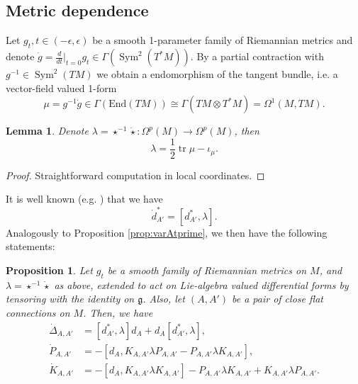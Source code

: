 \documentclass[11pt,a4paper]{amsart}
\theoremstyle{plain} %
\newtheorem{lem}[thm]{Lemma}
\newtheorem{prop}[thm]{Proposition}
\theoremstyle{definition}
\theoremstyle{remark}
\newcommand{\g}{\mathfrak{g}}
\newcommand{\dd}{d}
\newcommand{\tr}{\operatorname{tr}}
\newcommand{\Sym}{\operatorname{Sym}}
\newcommand{\mr}{\mathrm}
\begin{document}
\subsection{Metric dependence}\label{sec: metric}
Let $g_t, t \in (-\epsilon,\epsilon)$ be a smooth 1-parameter family of Riemannian metrics and denote $\dot{g} = \frac{d}{dt}\big|_{t=0}g_t \in \Gamma(\Sym^2(T^*M))$. By a partial contraction with $g^{-1} \in \Sym^2(TM)$ we obtain a endomorphism of the tangent bundle, i.e. a vector-field valued 1-form
\begin{equation}
    \mu = g^{-1}\dot{g}\in\Gamma(\mr{End}(TM)) \cong \Gamma(TM \otimes T^*M) = \Omega^1(M,TM).
\end{equation}
\begin{lem}\label{lem: lambda formula}
 Denote $\lambda = \star^{-1} \dot{\star} \colon \Omega^p(M) \to \Omega^p(M)$, then 
 \begin{equation}
     \lambda = \frac12\tr\mu - \iota_\mu.
 \end{equation}
\end{lem}
\begin{proof}
Straightforward computation in local coordinates.
\end{proof}
It is well known (e.g. \cite{Ray1971}) that we have 
    \begin{equation} \dot{\dd}^*_{A'} = [\dd^*_{A'},\lambda].\label{eq: var d star metric}\end{equation}
Analogously to Proposition \ref{prop:varAtprime}, we then have the following statements:
\begin{prop}
    Let $g_t$ be a smooth family of Riemannian metrics on $M$, and $\lambda = \star^{-1} \dot{\star}$ as above, extended to act on Lie-algebra valued differential forms by tensoring with the identity on $\g$. Also, let $(A,A')$ be a pair of close flat connections on $M$. Then, we have 
\begin{align}
    \dot{\Delta}_{A,A'} &= [\dd^*_{A'},\lambda]\dd_A + \dd_A[\dd^*_{A'},\lambda], \label{eq: var Delta metric} \\
    \dot{P}_{A,A'} &= - [\dd_A, K_{A,A'}\lambda P_{A,A'} - P_{A,A'}\lambda K_{A,A'}], \label{eq: var P metric} \\
    \dot{K}_{A,A'} &= -[\dd_A,K_{A,A'}\lambda K_{A,A'}] - P_{A,A'}\lambda K_{A,A'} + K_{A,A'} \lambda P_{A,A'}. \label{eq: var K metric}
\end{align}
\end{prop}
\end{document}
